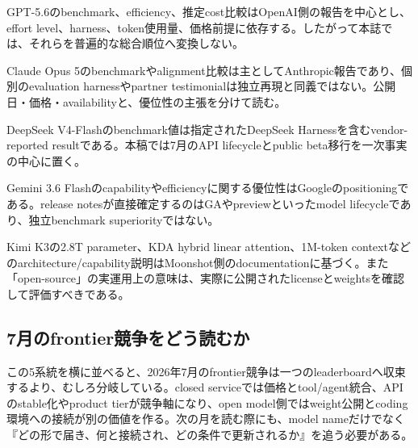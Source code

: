 \begin{claimboundary}
GPT-5.6のbenchmark、efficiency、推定cost比較はOpenAI側の報告を中心とし、effort level、harness、token使用量、価格前提に依存する。したがって本誌では、それらを普遍的な総合順位へ変換しない。\autocite{src-dca7adc62d79,src-e19fbb75eb44,src-eb71f165025c}
\end{claimboundary}

\begin{claimboundary}
Claude Opus 5のbenchmarkやalignment比較は主としてAnthropic報告であり、個別のevaluation harnessやpartner testimonialは独立再現と同義ではない。公開日・価格・availabilityと、優位性の主張を分けて読む。\autocite{src-f6aa679babd7}
\end{claimboundary}

\begin{claimboundary}
DeepSeek V4-Flashのbenchmark値は指定されたDeepSeek Harnessを含むvendor-reported resultである。本稿では7月のAPI lifecycleとpublic beta移行を一次事実の中心に置く。\autocite{src-e547d0d8cbe3}
\end{claimboundary}

\begin{claimboundary}
Gemini 3.6 Flashのcapabilityやefficiencyに関する優位性はGoogleのpositioningである。release notesが直接確定するのはGAやpreviewといったmodel lifecycleであり、独立benchmark superiorityではない。\autocite{src-a24fd97eb3d0}
\end{claimboundary}

\begin{claimboundary}
Kimi K3の2.8T parameter、KDA hybrid linear attention、1M-token contextなどのarchitecture/capability説明はMoonshot側のdocumentationに基づく。また「open-source」の実運用上の意味は、実際に公開されたlicenseとweightsを確認して評価すべきである。\autocite{src-9191d43918fc}
\end{claimboundary}

\subsection{7月のfrontier競争をどう読むか}

この5系統を横に並べると、2026年7月のfrontier競争は一つのleaderboardへ収束するより、むしろ分岐している。closed serviceでは価格とtool/agent統合、APIのstable化やproduct tierが競争軸になり、open model側ではweight公開とcoding環境への接続が別の価値を作る。次の月を読む際にも、model nameだけでなく『どの形で届き、何と接続され、どの条件で更新されるか』を追う必要がある。\autocite{src-9191d43918fc,src-a24fd97eb3d0,src-e19fbb75eb44,src-e547d0d8cbe3,src-f6aa679babd7}
